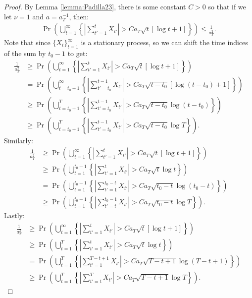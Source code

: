 \begin{proof}
By Lemma \ref{lemma:Padilla23}, there is some constant $C > 0$ so that if we let $\nu = 1$ and $a = a_T^{-1}$, then:
\begin{align*}
    \Pr \left(\bigcup_{t=1}^\infty\left\{\left|\sum_{t'=1}^t X_{t'}\right| > Ca_T\sqrt{t}\left[\log t + 1\right]\right\}\right) 
    \leq \frac{1}{a_T^2}.
\end{align*}
Note that since $\{X_t\}_{t=1}^\infty$ is a stationary process, so we can shift the time indices of the sum by $t_0-1$ to get:
\small
\begin{align*}
    \frac{1}{a_T^2} &\geq \Pr \left(\bigcup_{t=1}^\infty\left\{\left|\sum_{t'=1}^t X_{t'}\right| > Ca_T\sqrt{t}\left[\log t + 1\right]\right\}\right) \\
    &= \Pr \left(\bigcup_{t=t_0+1}^\infty\left\{\left|\sum_{t'=t_0}^{t-1} X_{t'}\right| > C a_T\sqrt{t-t_0}\left[\log (t-t_0) + 1\right]\right\}\right) \tag{stationarity} \\
    &\geq \Pr \left(\bigcup_{t=t_0+1}^{T}\left\{\left|\sum_{t'=t_0}^{t-1} X_{t'}\right| > C a_T\sqrt{t-t_0}\log (t-t_0)\right\}\right)\\
    &\geq \Pr \left(\bigcup_{t=t_0+1}^{T}\left\{\left|\sum_{t'=t_0}^{t-1} X_{t'}\right| > C a_T\sqrt{t-t_0}\log T\right\}\right). \tag{$T > t-t_0$}
\end{align*}
\normalsize
Similarly:
\small
\begin{align*}
    \frac{1}{a_T^2} &\geq \Pr \left(\bigcup_{t=1}^\infty\left\{\left|\sum_{t'=1}^t X_{t'}\right| > Ca_T\sqrt{t} \left[\log t + 1\right]\right\}\right) \\
    &\geq \Pr \left(\bigcup_{t=1}^{t_0-1}\left\{\left|\sum_{t'=1}^t X_{t'}\right| > Ca_T\sqrt{t}\log t\right\}\right) \\
    &= \Pr \left(\bigcup_{t=1}^{t_0-1}\left\{\left|\sum_{t'=1}^{t_0 - t} X_{t'}\right| > Ca_T\sqrt{t_0- t}\log (t_0 - t)\right\}\right)  \\
    &\geq \Pr \left(\bigcup_{t=1}^{t_0-1}\left\{\left|\sum_{t'=t}^{t_0-1} X_{t'}\right| > Ca_T\sqrt{t_0-t}\log T\right\}\right). \tag{$T > t_0-t$}
\end{align*}
\normalsize
Lastly:
\small
\begin{align*}
     \frac{1}{a_T^2} &\geq \Pr \left(\bigcup_{t=1}^\infty\left\{\left|\sum_{t'=1}^t X_{t'}\right| > Ca_T\sqrt{t} \left[\log t + 1\right]\right\}\right) \\
     &\geq \Pr \left(\bigcup_{t=1}^{T}\left\{\left|\sum_{t'=1}^{t} X_{t'}\right| > Ca_T\sqrt{t}\log t\right\}\right) \\
    &= \Pr \left(\bigcup_{t=1}^{T}\left\{\left|\sum_{t'=1}^{T - t + 1} X_{t'}\right| > Ca_T\sqrt{T - t + 1}\log (T - t+1)\right\}\right)  \\
    &\geq \Pr \left(\bigcup_{t=1}^{T}\left\{\left|\sum_{t'=t}^{T} X_{t'}\right| > Ca_T\sqrt{T-t+1}\log T\right\}\right). \tag{$T > T-t+1$}
\end{align*}
\end{proof}
